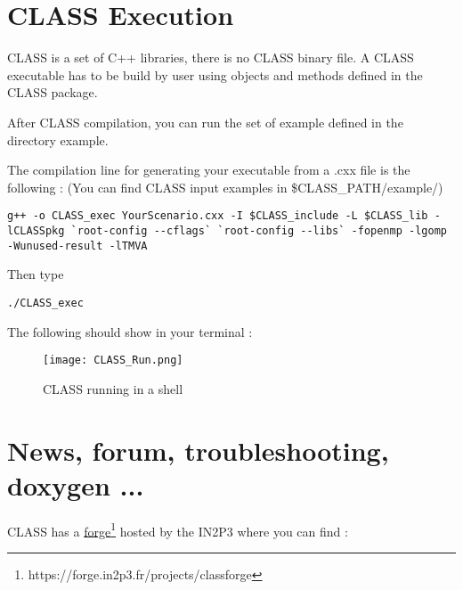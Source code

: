 \chapter{CLASS Execution}
CLASS is a set of C++ libraries, there is no CLASS binary file. A CLASS executable has to be build by user using objects and methods defined in the CLASS package.

After CLASS compilation, you can run the set of example defined in the directory example. 


The compilation line for generating your executable from a .cxx file is the following :
(You can find CLASS input examples in \$CLASS\_PATH/example/)

\begin{center}
\begin{minipage}{\textwidth}
\begin{lstlisting}[style=terminal]
g++ -o CLASS_exec YourScenario.cxx -I $CLASS_include -L $CLASS_lib -lCLASSpkg `root-config --cflags` `root-config --libs` -fopenmp -lgomp -Wunused-result -lTMVA
\end{lstlisting}
\end{minipage}
\end{center}
Then type 
\begin{center}
\begin{minipage}{\textwidth}
\begin{lstlisting}[style=terminal]
./CLASS_exec
\end{lstlisting}
\end{minipage}
\end{center}

The following should show in your terminal :

    \begin{figure}[H]
    \centering
    \centerline{\texttt{[image: CLASS\_Run.png]}}
    \caption{CLASS running in a shell}
    \label{fig:CLASSRUN}
    \end{figure}




\chapter{News, forum, troubleshooting, doxygen ...}
CLASS has a \href{https://forge.in2p3.fr/projects/classforge}{forge}\footnote{https://forge.in2p3.fr/projects/classforge} hosted by the IN2P3  where you can find :

